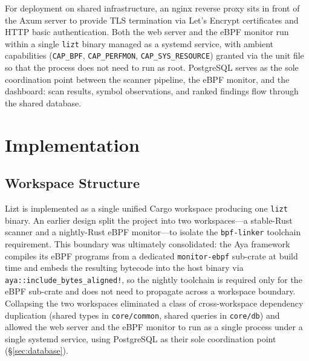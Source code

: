\documentclass[conference]{IEEEtran}
\begin{document}
For deployment on shared infrastructure, an nginx reverse proxy sits in front of the Axum server to provide TLS termination via Let's Encrypt certificates and HTTP basic authentication. Both the web server and the eBPF monitor run within a single \texttt{lizt} binary managed as a systemd service, with ambient capabilities (\texttt{CAP\_BPF}, \texttt{CAP\_PERFMON}, \texttt{CAP\_SYS\_RESOURCE}) granted via the unit file so that the process does not need to run as root. PostgreSQL serves as the sole coordination point between the scanner pipeline, the eBPF monitor, and the dashboard: scan results, symbol observations, and ranked findings flow through the shared database.



\section{Implementation}

\subsection{Workspace Structure}
\label{sec:workspace}

Lizt is implemented as a single unified Cargo workspace producing one \texttt{lizt} binary. An earlier design split the project into two workspaces---a stable-Rust scanner and a nightly-Rust eBPF monitor---to isolate the \texttt{bpf-linker} toolchain requirement. This boundary was ultimately consolidated: the Aya framework compiles its eBPF programs from a dedicated \texttt{monitor-ebpf} sub-crate at build time and embeds the resulting bytecode into the host binary via \texttt{aya::include\_bytes\_aligned!}, so the nightly toolchain is required only for the eBPF sub-crate and does not need to propagate across a workspace boundary. Collapsing the two workspaces eliminated a class of cross-workspace dependency duplication (shared types in \texttt{core/common}, shared queries in \texttt{core/db}) and allowed the web server and the eBPF monitor to run as a single process under a single systemd service, using PostgreSQL as their sole coordination point (\S\ref{sec:database}).
\end{document}
